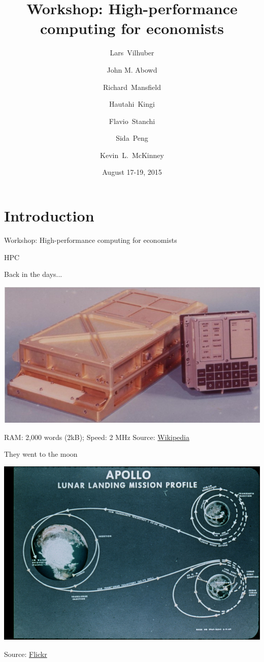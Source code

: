 \documentclass[xcolor=table,compress]{beamer}
\title[Computing for Economists]{Workshop: High-performance computing for economists}
\author[Vilhuber, Abowd, Mansfield, McKinney]{%
  Lars~Vilhuber\inst{1} \and
  John M. Abowd\inst{1} \and
  Richard~Mansfield\inst{1} \and
  Hautahi~Kingi\inst{1} \and
  Flavio~Stanchi\inst{1} \and
  Sida~Peng\inst{1} \and
  Kevin~L.~McKinney %
}
\institute[Cornell]{
  \inst{1}%
   Cornell University, Economics Department,
}%
\date[Day 1]{August 17-19, 2015}
\begin{document}
\frame{\titlepage}


\section[Intro]{Introduction}


\begin{frame}
Workshop: High-performance computing for economists
\end{frame}


\begin{frame}{HPC}
\begin{block}{Back in the days...}
\begin{center}
\includegraphics[height=0.6\textheight]{./Agc_view}
\end{center}
\end{block}
\pause
RAM: 2,000 words (2kB); Speed: 2 MHz
\newline
\tiny Source: \href{http://upload.wikimedia.org/wikipedia/commons/7/79/Agc_view.jpg}{Wikipedia}
\end{frame}

\begin{frame}{They went to the moon}
\begin{center}
\includegraphics[height=0.7\textheight]{./apollo-11-path}
\end{center}
\tiny Source:  \href{http://farm2.staticflickr.com/1208/5105040212_346b792ee5_z.jpg}{Flickr}
\end{frame}
\end{document}
